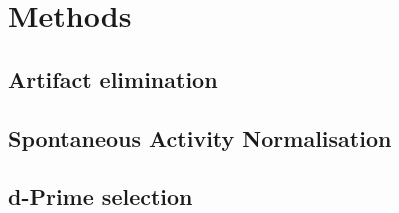 \section{Methods}

\FloatBarrier
\subsection{Artifact elimination}
\label{sec:ma}

\subsection{Spontaneous Activity Normalisation}
\label{sec:pl_san}

\subsection{d-Prime selection}
\label{sec:pl_dp}
